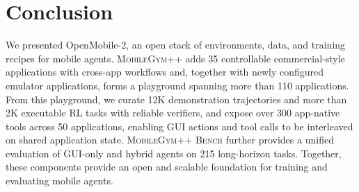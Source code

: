 \section{Conclusion}
\label{sec:conclusion}

We presented OpenMobile-2, an open stack of environments, data, and training recipes for mobile agents. \textsc{MobileGym++} adds 35 controllable commercial-style applications with cross-app workflows and, together with newly configured emulator applications, forms a playground spanning more than 110 applications. From this playground, we curate 12K demonstration trajectories and more than 2K executable RL tasks with reliable verifiers, and expose over 300 app-native tools across 50 applications, enabling GUI actions and tool calls to be interleaved on shared application state. \textsc{MobileGym++ Bench} further provides a unified evaluation of GUI-only and hybrid agents on 215 long-horizon tasks. Together, these components provide an open and scalable foundation for training and evaluating mobile agents.
